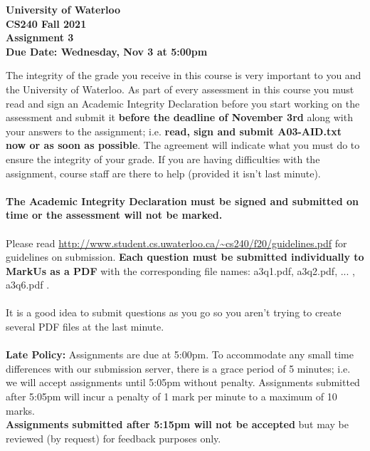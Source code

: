 \documentclass[12pt]{article}
\begin{document}
	
	\begin{center}
		{\Large\bf University of Waterloo}\\
		\vspace{3mm}
		{\Large\bf CS240 Fall 2021}\\
		\vspace{2mm}
		{\Large\bf Assignment 3}\\
		\vspace{3mm}
		\textbf{Due Date: Wednesday, Nov 3 at 5:00pm}
	\end{center}
	
	\def\question#1{\item[\bf #1.]}
	\def\part#1{\item[\bf #1)]}
	\newcommand{\pc}[1]{\mbox{\textbf{#1}}} %
	
	The integrity of the grade you receive in this course is very important to you and 
	the University of Waterloo.  As part of every assessment in this course you must read 
	and sign an Academic Integrity Declaration before you start working on the assessment and
	submit it \textbf{before the deadline of November 3rd} along with your answers to the 
	assignment; i.e. \textbf{read, sign and submit A03-AID.txt now or as soon as possible}.
	The agreement will indicate what you must do to ensure the integrity of your grade.
	If you are having difficulties with the assignment, course staff are there to help
	(provided it isn't last minute). \\
	~\\
	\textbf{The Academic Integrity Declaration must be signed and submitted on time or the
		assessment will not be marked.} \\
	~\\
	Please read
	\url{http://www.student.cs.uwaterloo.ca/~cs240/f20/guidelines.pdf} for guidelines on submission.  
	\textbf{Each question must be submitted individually to MarkUs as a PDF} with the corresponding file names: 
	a3q1.pdf, a3q2.pdf, ... , a3q6.pdf . \\
	~\\
	It is a good idea to submit questions as you go so you aren't trying to create several PDF files at the last minute. \\
	~\\
	\textbf{Late Policy:} Assignments are due at 5:00pm.
	To accommodate any small time differences with our submission server, there is a grace period of 5 minutes; i.e. we will accept assignments until 5:05pm without penalty.  Assignments submitted after 5:05pm will incur a penalty of 1 mark per minute to a maximum of 10 marks.   \\
	\textbf{Assignments submitted after 5:15pm will not be accepted}  
	but may be reviewed (by request) for feedback purposes only. \\  
	~\\
	
\end{document}
